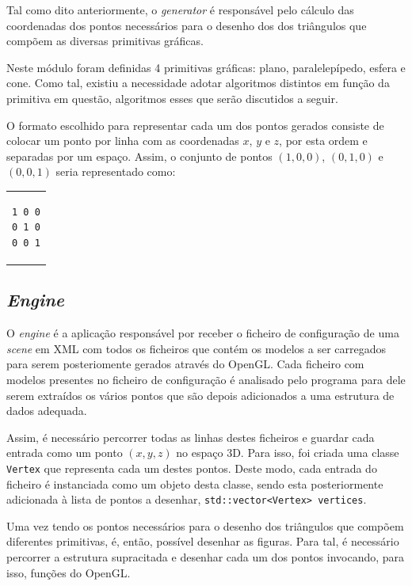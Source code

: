 \documentclass[a4paper, 11pt]{article}
\begin{document}
Tal como dito anteriormente, o \textit{generator} é responsável pelo cálculo das coordenadas dos 
pontos necessários para o desenho dos dos triângulos que compõem as diversas primitivas gráficas.

Neste módulo foram definidas 4 primitivas gráficas: plano, paralelepípedo, esfera e cone. Como 
tal, existiu a necessidade adotar algoritmos distintos em função da primitiva em questão, algoritmos
esses que serão discutidos a seguir.

O formato escolhido para representar cada um dos pontos gerados consiste de colocar um ponto por 
linha com as coordenadas $x$, $y$ e $z$, por esta ordem e separadas por um espaço. Assim, o conjunto
de pontos $(1, 0, 0)$, $(0, 1, 0)$ e $(0, 0, 1)$ seria representado como:

\begin{center}
\begin{tabular}{c}
\begin{lstlisting}
1 0 0
0 1 0
0 0 1
\end{lstlisting}
\end{tabular}
\end{center}

\subsection{\textit{Engine}}

O \textit{engine} é a aplicação responsável por receber o ficheiro de configuração de uma 
\textit{scene} em XML com todos os ficheiros que contém os modelos a ser carregados para serem
posteriomente gerados através do OpenGL. Cada ficheiro com modelos presentes no ficheiro de
configuração é analisado pelo programa para dele serem extraídos os vários pontos que
são depois adicionados a uma estrutura de dados adequada. 

Assim, é necessário percorrer todas as linhas destes ficheiros e guardar cada entrada como um 
ponto $(x, y, z)$ no espaço 3D.  Para isso, foi criada uma classe \texttt{Vertex} que representa
cada um destes pontos. Deste modo, cada entrada do ficheiro é instanciada como um objeto desta
classe, sendo esta posteriormente adicionada à lista de pontos a desenhar,
\texttt{std::vector<Vertex> vertices}.

Uma vez tendo os pontos necessários para o desenho dos triângulos que compõem diferentes 
primitivas, é, então, possível desenhar as figuras. Para tal, é necessário percorrer a estrutura
supracitada e desenhar cada um dos pontos invocando, para isso, funções do OpenGL.
\end{document}
